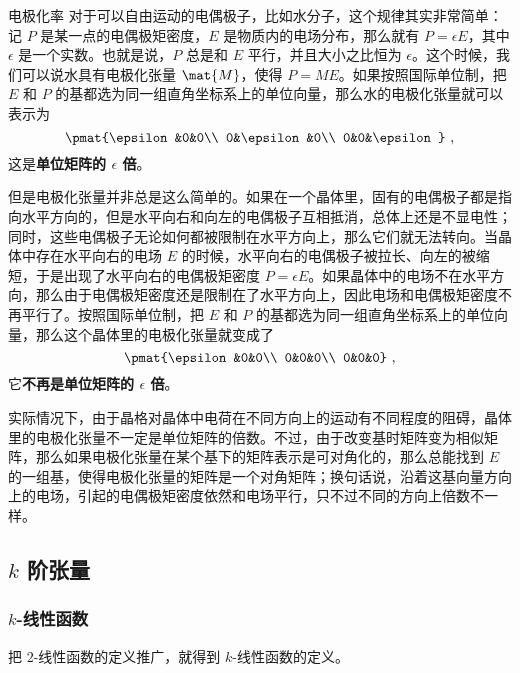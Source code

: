\begin{example}{电极化率}
对于可以自由运动的电偶极子，比如水分子，这个规律其实非常简单：记 ${P}$ 是某一点的电偶极矩密度，${E}$ 是物质内的电场分布，那么就有 ${P}=\epsilon{E}$，其中 $\epsilon$ 是一个实数。也就是说，${P}$ 总是和 ${E}$ 平行，并且大小之比恒为 $\epsilon$。这个时候，我们可以说水具有电极化张量 $\mat{M}$，使得 ${P}={M}{E}$。如果按照国际单位制，把 ${E}$ 和 ${P}$ 的基都选为同一组直角坐标系上的单位向量，那么水的电极化张量就可以表示为
\begin{equation}
\pmat{\epsilon&0&0\\ 0&\epsilon&0\\ 0&0&\epsilon}~,
\end{equation}
这是\textbf{单位矩阵的 $\epsilon$ 倍}。

但是电极化张量并非总是这么简单的。如果在一个晶体里，固有的电偶极子都是指向水平方向的，但是水平向右和向左的电偶极子互相抵消，总体上还是不显电性；同时，这些电偶极子无论如何都被限制在水平方向上，那么它们就无法转向。当晶体中存在水平向右的电场 ${E}$ 的时候，水平向右的电偶极子被拉长、向左的被缩短，于是出现了水平向右的电偶极矩密度 ${P}=\epsilon{E}$。如果晶体中的电场不在水平方向，那么由于电偶极矩密度还是限制在了水平方向上，因此电场和电偶极矩密度不再平行了。按照国际单位制，把 ${E}$ 和 ${P}$ 的基都选为同一组直角坐标系上的单位向量，那么这个晶体里的电极化张量就变成了
\begin{equation}
\pmat{\epsilon&0&0\\ 0&0&0\\ 0&0&0}~,
\end{equation}
它\textbf{不再是单位矩阵的 $\epsilon$ 倍}。

实际情况下，由于晶格对晶体中电荷在不同方向上的运动有不同程度的阻碍，晶体里的电极化张量不一定是单位矩阵的倍数。不过，由于改变基时矩阵变为相似矩阵，那么如果电极化张量在某个基下的矩阵表示是可对角化的，那么总能找到 ${E}$ 的一组基，使得电极化张量的矩阵是一个对角矩阵；换句话说，沿着这基向量方向上的电场，引起的电偶极矩密度依然和电场平行，只不过不同的方向上倍数不一样。

\end{example}


\subsection{$k$ 阶张量}

\subsubsection{$k$-线性函数}

把 $2$-线性函数的定义推广，就得到 $k$-线性函数的定义。

